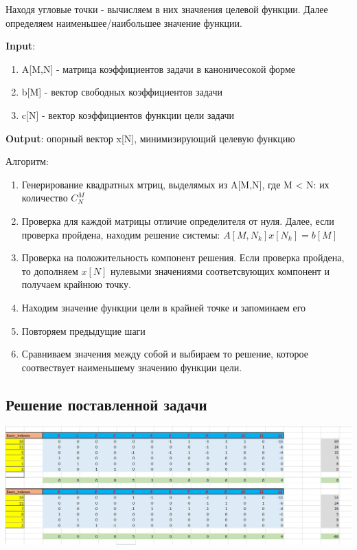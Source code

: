 \documentclass{article}
\begin{document}
    Находя угловые точки - вычисляем в них значяения целевой функции. Далее определяем наименьшее/наибольшее значение функции.

    \textbf{Input}:
    \begin{enumerate}
        \item A[M,N] - матрица коэффициентов задачи в каноничесокой форме
        \item b[M] - вектор свободных коэффициентов задачи
        \item c[N] - вектор коэффициентов функции цели задачи
    \end{enumerate}

    \textbf{Output}: опорный вектор x[N], минимизирующий целевую функцию

    Алгоритм:
    \begin{enumerate}
        \item Генерирование квадратных мтриц, выделямых из A[M,N], где M < N: их количество $C^M_N$
        \item Проверка для каждой матрицы отличие определителя от нуля. Далее, если проверка пройдена, находим решение системы: $A[M, N_k]x[N_k] = b[M]$
        \item Проверка на положительность компонент решения. Если проверка пройдена, то дополняем $x[N]$ нулевыми значениями соответсвующих компонент и получаем крайнюю точку.
        \item Находим значение функции цели в крайней точке и запоминаем его
        \item Повторяем предыдущие шаги
        \item Сравниваем значения между собой и выбираем то решение, которое соотвествует наименьшему значению функции цели.
    \end{enumerate}

    \subsection{Решение поставленной задачи}
    \begin{center}
         \includegraphics[width=\textwidth]{../graphics/table.jpg}
    \end{center}
\end{document}

